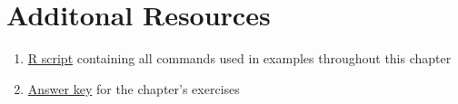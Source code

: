 \section{Additonal Resources}
\begin{enumerate}
	\item \href{https://github.com/faulconbridge/appliedStats/blob/master/LaTeX/part01/RScripts/uncertainty.R}{R script} containing all commands used in examples throughout this chapter
	\item \href{https://github.com/faulconbridge/appliedStats/blob/master/LaTeX/part01/answers/uncertainty.md}{Answer key} for the chapter's exercises
\end{enumerate}